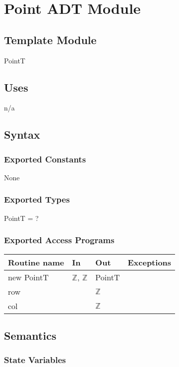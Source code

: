 \documentclass[12pt]{article}
\begin{document}
\newpage
\section* {Point ADT Module}
\subsection*{Template Module}
PointT


\subsection* {Uses}
n/a


\subsection* {Syntax}
\subsubsection* {Exported Constants}
None

\subsubsection* {Exported Types}
PointT = ?

\subsubsection* {Exported Access Programs}
\begin{tabular}{| l | l | l | l |}
\hline
\textbf{Routine name} & \textbf{In} & \textbf{Out} & \textbf{Exceptions}\\
\hline
new PointT & $\mathbb{Z}$, $\mathbb{Z}$ & PointT & \\
\hline
row & ~ & $\mathbb{Z}$ & ~\\
\hline
col & ~ & $\mathbb{Z}$ & ~\\
\hline
\end{tabular}


\subsection* {Semantics}
\subsubsection* {State Variables}
\end{document}

